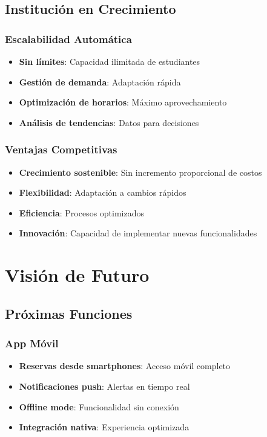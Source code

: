 \documentclass[12pt,a4paper]{article}
\begin{document}
\subsection{Institución en Crecimiento}

\subsubsection{Escalabilidad Automática}
\begin{itemize}
    \item \textbf{Sin límites}: Capacidad ilimitada de estudiantes
    \item \textbf{Gestión de demanda}: Adaptación rápida
    \item \textbf{Optimización de horarios}: Máximo aprovechamiento
    \item \textbf{Análisis de tendencias}: Datos para decisiones
\end{itemize}

\subsubsection{Ventajas Competitivas}
\begin{itemize}
    \item \textbf{Crecimiento sostenible}: Sin incremento proporcional de costos
    \item \textbf{Flexibilidad}: Adaptación a cambios rápidos
    \item \textbf{Eficiencia}: Procesos optimizados
    \item \textbf{Innovación}: Capacidad de implementar nuevas funcionalidades
\end{itemize}

\section{Visión de Futuro}

\subsection{Próximas Funciones}

\subsubsection{App Móvil}
\begin{itemize}
    \item \textbf{Reservas desde smartphones}: Acceso móvil completo
    \item \textbf{Notificaciones push}: Alertas en tiempo real
    \item \textbf{Offline mode}: Funcionalidad sin conexión
    \item \textbf{Integración nativa}: Experiencia optimizada
\end{itemize}
\end{document}
